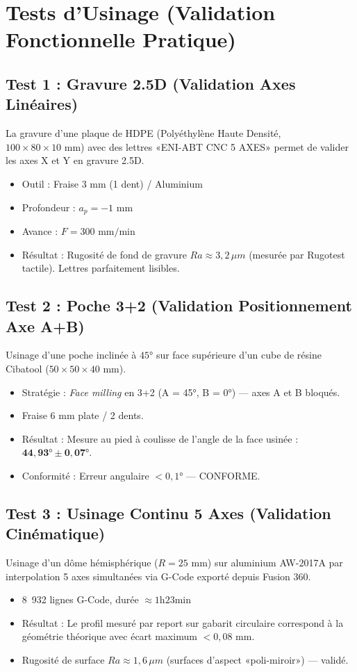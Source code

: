 \section{Tests d'Usinage (Validation Fonctionnelle Pratique)}

\subsection{Test 1 : Gravure 2.5D (Validation Axes Linéaires)}
La gravure d'une plaque de HDPE (Polyéthylène Haute Densité, $100 \times 80 \times 10\text{ mm}$) avec des lettres «ENI-ABT CNC 5 AXES» permet de valider les axes X et Y en gravure 2.5D.
\begin{itemize}
    \item Outil : Fraise $3\text{ mm}$ (1 dent) / Aluminium
    \item Profondeur : $a_p = -1\text{ mm}$
    \item Avance : $F = 300\text{ mm/min}$
    \item Résultat : Rugosité de fond de gravure $Ra \approx 3{,}2\,\mu m$ (mesurée par Rugotest tactile). Lettres parfaitement lisibles.
\end{itemize}

\subsection{Test 2 : Poche 3+2 (Validation Positionnement Axe A+B)}
Usinage d'une poche inclinée à $45°$ sur face supérieure d'un cube de résine Cibatool ($50 \times 50 \times 40\text{ mm}$).
\begin{itemize}
    \item Stratégie : \textit{Face milling} en 3+2 (A = 45°, B = 0°) — axes A et B bloqués.
    \item Fraise $6\text{ mm}$ plate / 2 dents.
    \item Résultat : Mesure au pied à coulisse de l'angle de la face usinée : $\mathbf{44{,}93° \pm 0{,}07°}$.
    \item Conformité : Erreur angulaire $< 0{,}1°$ — CONFORME.
\end{itemize}

\subsection{Test 3 : Usinage Continu 5 Axes (Validation Cinématique)}
Usinage d'un dôme hémisphérique ($R = 25\text{ mm}$) sur aluminium AW-2017A par interpolation 5 axes simultanées via G-Code exporté depuis Fusion 360.
\begin{itemize}
    \item 8~932 lignes G-Code, durée $\approx 1\text{h}23\text{min}$
    \item Résultat : Le profil mesuré par report sur gabarit circulaire correspond à la géométrie théorique avec écart maximum $< 0{,}08\text{ mm}$.
    \item Rugosité de surface $Ra \approx 1{,}6\,\mu m$ (surfaces d'aspect «poli-miroir») — validé.
\end{itemize}

